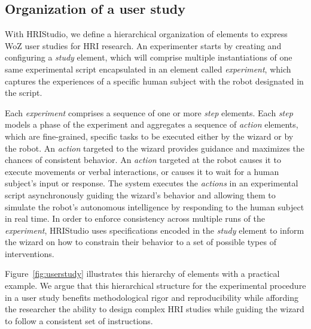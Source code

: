 \documentclass[letterpaper, 10 pt, conference]{ieeeconf}
\begin{document}
\subsection{Organization of a user study}

With HRIStudio, we define a hierarchical organization of elements to express WoZ user studies for HRI research. An experimenter starts by creating and configuring a \emph{study} element, which will comprise multiple instantiations of one same experimental script encapsulated in an element called \emph{experiment}, which captures the experiences of a specific human subject with the robot designated in the script. 

Each \emph{experiment} comprises a sequence of one or more \emph{step} elements. Each \emph{step} models a phase of the experiment and aggregates a sequence of \emph{action} elements, which are fine-grained, specific tasks to be executed either by the wizard or by the robot. An \emph{action} targeted to the wizard provides guidance and maximizes the chances of consistent behavior. An \emph{action} targeted at the robot causes it to execute movements or verbal interactions, or causes it to wait for a human subject's input or response. The system executes the \emph{actions} in an experimental script asynchronously guiding the wizard's behavior and allowing them to simulate the robot's autonomous intelligence by responding to the human subject in real time. In order to enforce consistency across multiple runs of the \emph{experiment}, HRIStudio uses specifications encoded in the \emph{study} element to inform the wizard on how to constrain their behavior to a set of possible types of interventions.

Figure~\ref{fig:userstudy} illustrates this hierarchy of elements with a practical example.  We argue that this hierarchical structure for the experimental procedure in a user study benefits methodological rigor and reproducibility while affording the researcher the ability to design complex HRI studies while guiding the wizard to follow a consistent set of instructions.



\end{document}

